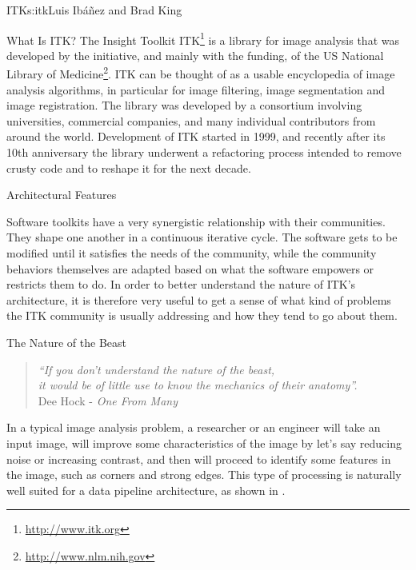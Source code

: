\begin{aosachapter}{ITK}{s:itk}{Luis Ib\'{a}\~{n}ez and Brad King}


\begin{aosasect1}{What Is ITK?}
The Insight Toolkit ITK\footnote{\url{http://www.itk.org}} is a library for
image analysis that was developed by the initiative, and mainly with the
funding, of the US National Library of
Medicine\footnote{\url{http://www.nlm.nih.gov}}. ITK can be thought of as a
usable encyclopedia of image analysis algorithms, in particular for image
filtering, image segmentation and image registration. The library was developed
by a consortium involving universities, commercial companies, and many
individual contributors from around the world.  Development of ITK started in
1999, and recently after its 10th anniversary the library underwent a
refactoring process intended to remove crusty code and to reshape it for the
next decade.
\end{aosasect1}

\begin{aosasect1}{Architectural Features}

Software toolkits have a very synergistic relationship with their communities.
They shape one another in a continuous iterative cycle.  The software gets to
be modified until it satisfies the needs of the community, while the community
behaviors themselves are adapted based on what the software empowers or
restricts them to do. In order to better understand the nature of ITK's
architecture, it is therefore very useful to get a sense of what kind of
problems the ITK community is usually addressing and how they tend to go about
them.

\begin{aosasect2}{The Nature of the Beast}

\begin{center}
\begin{quotation}
\emph{
``If you don't understand the nature of the beast,\\
it would be of little use to know the mechanics of their anatomy''.\\
}
\hfill Dee Hock - \emph{One From Many}
\end{quotation}
\end{center}

In a typical image analysis problem, a researcher or an engineer will take an
input image, will improve some characteristics of the image by let's say
reducing noise or increasing contrast, and then will proceed to identify some
features in the image, such as corners and strong edges. This type of
processing is naturally well suited for a data pipeline architecture, as
shown in .


\end{aosasect2}
\end{aosasect1}
\end{aosachapter}
